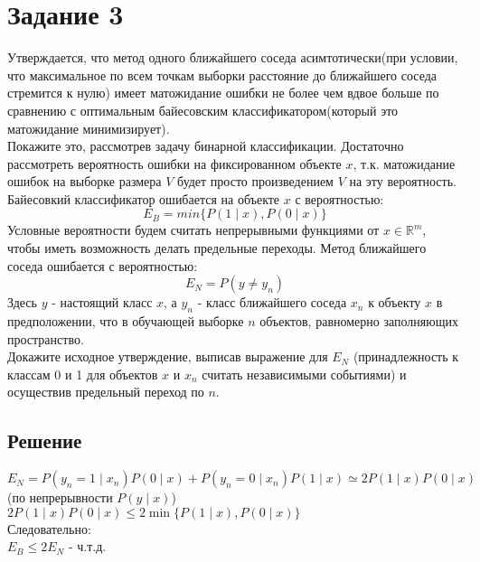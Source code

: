 \documentclass[11pt]{article}
\begin{document}
\section{Задание 3}
Утверждается, что метод одного ближайшего соседа асимтотически(при условии, что максимальное по всем точкам выборки расстояние до ближайшего соседа стремится к нулю) имеет матожидание ошибки не более чем вдвое больше по сравнению с оптимальным байесовским классификатором(который это матожидание минимизирует). \\
Покажите это, рассмотрев задачу бинарной классификации. Достаточно рассмотреть вероятность ошибки на фиксированном объекте $x$, т.к. матожидание ошибок на выборке размера $V$ будет просто произведением $V$ на эту вероятность. Байесовкий классификатор ошибается на объекте $x$ с вероятностью:
\begin{displaymath}
E_{B} = min\{P(1 \mid x), P(0 \mid x)\}
\end{displaymath}
Условные вероятности будем считать непрерывными функциями от $x \in \mathbb {R}^{m}$, чтобы иметь
возможность делать предельные переходы. Метод ближайшего соседа ошибается с вероятностью: 
\begin{displaymath}
E_{N} = P(y \ne y_n)
\end{displaymath}
Здесь $y$ - настоящий класс $x$, а $y_n$ - класс ближайшего соседа $x_n$ к объекту $x$ в предположении, что в обучающей выборке $n$ объектов, равномерно заполняющих пространство.\\
Докажите исходное утверждение, выписав выражение для $E_N$ (принадлежность к классам
0 и 1 для объектов $x$ и $x_n$ считать независимыми событиями) и осуществив предельный
переход по $n$.

\subsection{Решение}
$E_N = P(y_n = 1 \mid x_n)P(0\mid x) + P(y_n = 0 \mid x_n)P(1\mid x) \simeq 2P(1 \mid x)P(0 \mid x)$ (по непрерывности $P(y \mid x)$)\\
$2P(1 \mid x)P(0 \mid x) \leq 2\min\{P(1 \mid x), P(0 \mid x)\}$\\
Следовательно:\\
$E_B \leq 2E_N$ - ч.т.д.
\end{document}
